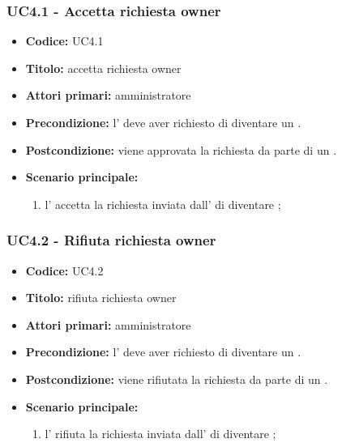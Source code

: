\documentclass[casi-duso]{subfiles}
\begin{document}
\subsubsection{UC4.1 - Accetta richiesta owner}
\label{subsub:UC4.1}
\begin{itemize}
  \item \textbf{Codice:} UC4.1
  \item \textbf{Titolo:} accetta richiesta owner
  \item \textbf{Attori primari:} amministratore
  \item \textbf{Precondizione:} l' deve aver richiesto di diventare un .
  \item \textbf{Postcondizione:} viene approvata la richiesta da parte di un .
  \item \textbf{Scenario principale:} 
  \begin{enumerate}
    \item l' accetta la richiesta inviata dall' di diventare ;
  \end{enumerate}
\end{itemize}

\subsubsection{UC4.2 - Rifiuta richiesta owner}
\label{subsub:UC4.2}
\begin{itemize}
  \item \textbf{Codice:} UC4.2
  \item \textbf{Titolo:} rifiuta richiesta owner
  \item \textbf{Attori primari:} amministratore
  \item \textbf{Precondizione:} l' deve aver richiesto di diventare un .
  \item \textbf{Postcondizione:} viene rifiutata la richiesta da parte di un .
  \item \textbf{Scenario principale:} 
  \begin{enumerate}
    \item l' rifiuta la richiesta inviata dall' di diventare ;
  \end{enumerate}
\end{itemize}
\end{document}
